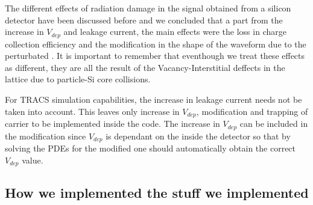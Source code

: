 The different effects of radiation damage in the signal obtained from a silicon detector have been discussed before and we concluded that a part from the increase in $V_{dep}$ and leakage current, the main effects were the loss in charge collection efficiency and the modification in the shape of the waveform due to the perturbated \neff. It is important to remember that eventhough we treat these effects as different, they are all the result of the Vacancy-Interstitial deffects in the lattice due to particle-Si core collisions.

For TRACS simulation capabilities, the increase in leakage current needs not be taken into account. This leaves only increase in $V_{dep}$, \neff modification and trapping of carrier to be implemented inside the code. The increase in $V_{dep}$ can be included in the \neff modification since $V_{dep}$ is dependant on the \neff inside the detector so that by solving the PDEs for the modified \neff one should automatically obtain the correct $V_{dep}$ value.




\subsection{How we implemented the stuff we implemented}

